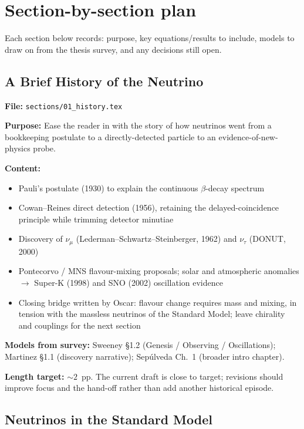 \documentclass[11pt]{article}
\begin{document}
\section{Section-by-section plan}

Each section below records: purpose, key equations/results to include, models to draw on from the
thesis survey, and any decisions still open.

\subsection{A Brief History of the Neutrino}
\label{plan:history}

\textbf{File:} \texttt{sections/01\_history.tex}

\textbf{Purpose:} Ease the reader in with the story of how neutrinos went from a bookkeeping
postulate to a directly-detected particle to an evidence-of-new-physics probe.

\textbf{Content:}
\begin{itemize}
    \item Pauli's postulate (1930) to explain the continuous $\beta$-decay spectrum
    \item Cowan--Reines direct detection (1956), retaining the delayed-coincidence principle
    while trimming detector minutiae
    \item Discovery of $\nu_\mu$ (Lederman--Schwartz--Steinberger, 1962) and $\nu_\tau$ (DONUT, 2000)
    \item Pontecorvo / MNS flavour-mixing proposals; solar and atmospheric anomalies
    $\to$ Super-K (1998) and SNO (2002) oscillation evidence
    \item Closing bridge written by Oscar: flavour change requires mass and mixing, in tension
    with the massless neutrinos of the Standard Model; leave chirality and couplings for the next
    section
\end{itemize}

\textbf{Models from survey:} Sweeney \S1.2 (Genesis / Observing / Oscillations); Martinez \S1.1
(discovery narrative); Sep\'ulveda Ch.~1 (broader intro chapter).

\textbf{Length target:} $\sim 2$~pp. The current draft is close to target; revisions should
improve focus and the hand-off rather than add another historical episode.

\subsection{Neutrinos in the Standard Model}
\label{plan:sm}
\end{document}
